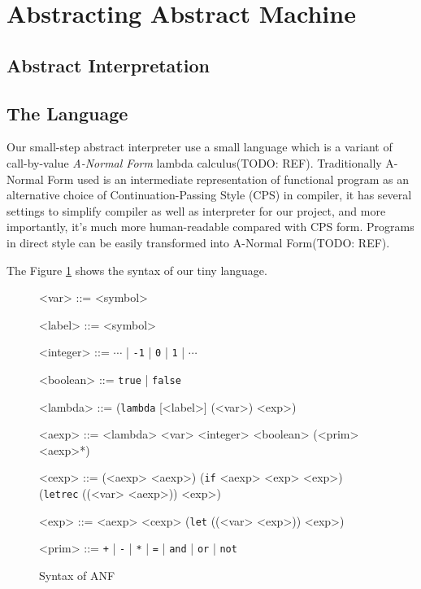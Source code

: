 \documentclass[paper=a4, fontsize=11pt]{scrartcl} %
\numberwithin{equation}{section} %
\numberwithin{figure}{section} %
\numberwithin{table}{section} %
\begin{document}

\section{Abstracting Abstract Machine}


\subsection{Abstract Interpretation}


\subsection{The Language}

Our small-step abstract interpreter use a small language which is a variant of call-by-value \textit{A-Normal Form} lambda calculus(TODO: REF). Traditionally A-Normal Form used is an intermediate representation of functional program as an alternative choice of Continuation-Passing Style (CPS) in compiler, it has several settings to simplify compiler as well as interpreter for our project, and more importantly, it's much more human-readable compared with CPS form. Programs in direct style can be easily transformed into A-Normal Form(TODO: REF).

The Figure \ref{fig:anf} shows the syntax of our tiny language.

\begin{figure}[h!]
\setlength{\grammarparsep}{7pt plus 1pt minus 1pt} %
\setlength{\grammarindent}{8em} %
\begin{grammar}
<var> ::= <symbol>

<label> ::= <symbol>

<integer> ::= $\cdots$ | \texttt{-1} | \texttt{0} | \texttt{1} | $\cdots$

<boolean> ::= \texttt{true} | \texttt{false}

<lambda> ::= (\texttt{lambda} [<label>] (<var>) <exp>)

<aexp> ::= <lambda>
\alt <var>
\alt <integer>
\alt <boolean>
\alt (<prim> <aexp>*)

<cexp> ::= (<aexp> <aexp>)
\alt (\texttt{if} <aexp> <exp> <exp>)
\alt (\texttt{letrec} ((<var> <aexp>)) <exp>)

<exp> ::= <aexp>
\alt <cexp>
\alt (\texttt{let} ((<var> <exp>)) <exp>)

<prim> ::= \texttt{+} | \texttt{-} | \texttt{*} | \texttt{=} | \texttt{and} | \texttt{or} | \texttt{not}
\end{grammar}
\caption{Syntax of ANF}
\label{fig:anf}
\end{figure}
\end{document}
